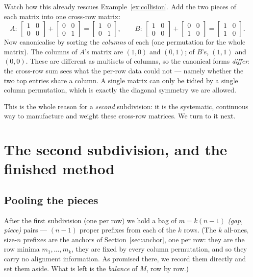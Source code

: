 \documentclass[11pt,a4paper]{article}
\theoremstyle{definition}
\theoremstyle{plain}
\begin{document}
Watch how this already rescues Example~\ref{ex:collision}. Add the two pieces
of each matrix into one cross-row matrix:
\[
   A:\ \begin{bmatrix}1&0\\0&0\end{bmatrix}+\begin{bmatrix}0&0\\0&1\end{bmatrix}
      =\begin{bmatrix}1&0\\0&1\end{bmatrix},
   \qquad
   B:\ \begin{bmatrix}1&0\\0&0\end{bmatrix}+\begin{bmatrix}0&0\\1&0\end{bmatrix}
      =\begin{bmatrix}1&0\\1&0\end{bmatrix}.
\]
Now canonicalise by sorting the \emph{columns} of each (one permutation for the
whole matrix). The columns of $A$'s matrix are $(1,0)$ and $(0,1)$; of $B$'s,
$(1,1)$ and $(0,0)$. These are different as multisets of columns, so the
canonical forms \emph{differ}: the cross-row sum sees what the per-row data
could not --- namely whether the two top entries share a column. A single matrix
can only be tidied by a single column permutation, which is exactly the diagonal
symmetry we are allowed.

\medskip\noindent
This is the whole reason for a \emph{second} subdivision: it is the systematic,
continuous way to manufacture and weight these cross-row matrices. We turn to it
next.

\section{The second subdivision, and the finished method}
\label{sec:second}

\subsection{Pooling the pieces}

After the first subdivision (one per row) we hold a bag of $m=k(n-1)$
\emph{(gap, piece)} pairs --- $(n-1)$ proper prefixes from each of the $k$ rows.
(The $k$ all-ones, size-$n$ prefixes are the anchors of
Section~\ref{sec:anchor}, one per row: they are the row minima
$m_1,\dots,m_k$, they are fixed by every column permutation, and so they carry
no alignment information. As promised there, we record them directly and set
them aside. What is left is the \emph{balance} of $M$, row by row.)
\end{document}
